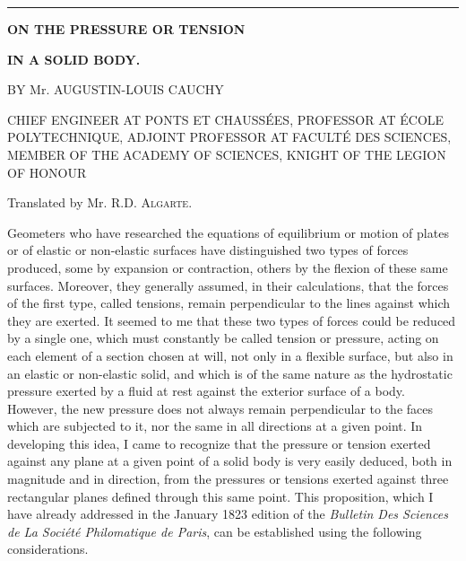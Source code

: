\documentclass[leqno,openright,smallroyalvopaper,8pt,twoside,showtrims]{memoir}
\begin{document}
\vspace*{0.5cm}
\noindent
\rule{\textwidth}{0.5pt}\vspace*{-\baselineskip}\vspace*{2pt} 
\vspace*{.2cm}
\begin{center}
{\LARGE \textbf{ON THE PRESSURE OR TENSION}}\vspace*{3pt} 

{\Large \textbf{IN A SOLID BODY.}}\vspace*{10pt} 

{\large BY Mr. AUGUSTIN-LOUIS CAUCHY} \vspace*{2pt} 

{CHIEF ENGINEER AT PONTS ET CHAUSS\'EES, PROFESSOR AT \'ECOLE POLYTECHNIQUE, ADJOINT PROFESSOR AT FACULT\'E DES SCIENCES, MEMBER OF THE ACADEMY OF SCIENCES, KNIGHT OF THE LEGION OF HONOUR}\vspace*{2pt} 


{\small Translated by Mr. R.D. {\normalfont\scshape Algarte}}.\vspace*{.5cm}

\quad{}\quad{}\vspace*{.5cm}


\end{center}
\normalfont

Geometers who have researched the equations of equilibrium or motion of plates or of elastic or non-elastic surfaces have distinguished two types of forces produced, some by expansion or contraction, others by the flexion of these same surfaces. Moreover, they generally assumed, in their calculations, that the forces of the first type, called tensions, remain perpendicular to the lines against which they are exerted. It seemed to me that these two types of forces could be reduced by a single one, which must constantly be called tension or pressure, acting on each element of a section chosen at will, not only in a flexible surface, but also in an elastic or non-elastic solid, and which is of the same nature as the hydrostatic pressure exerted by a fluid at rest against the exterior surface of a body. However, the new pressure does not always remain perpendicular to the faces which are subjected to it, nor the same in all directions at a given point. In developing this idea, I came to recognize that the pressure or tension exerted against any plane at a given point of a solid body is very easily deduced, both in magnitude and in direction, from the pressures or tensions exerted against three rectangular planes defined through this same point. This proposition, which I have already addressed in the January 1823 edition of the \emph{Bulletin Des Sciences de La Soci\'et\'e Philomatique de Paris}, can be established using the following considerations.
\end{document}
